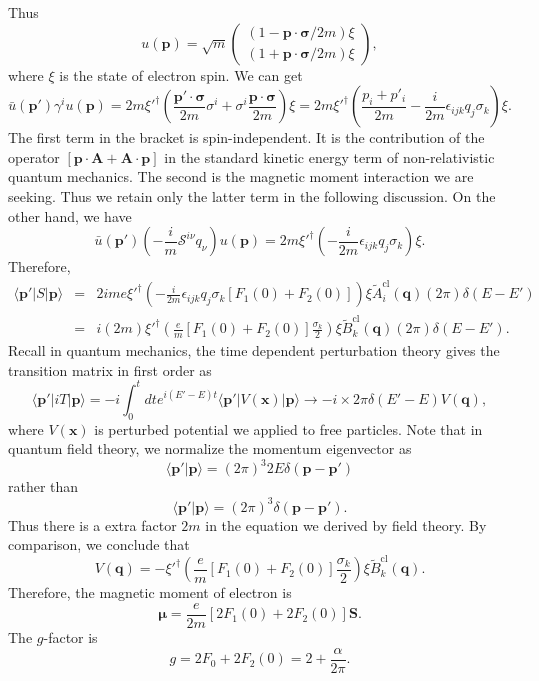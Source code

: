 Thus
\[u(\bm{p}) = \sqrt{m}  \begin{pmatrix}(1 - \bm{p}\cdot\bm{\sigma}/2m)\xi\\(1 + \bm{p}\cdot\bm{\sigma}/2m)\xi\end{pmatrix} ,\]
where $\xi$ is the state of electron spin. 
We can get
\[\bar{u}(\bm{p}') \gamma^i u(\bm{p}) = 2m \xi'^{\dagger} \left( \frac{\bm{p}'\cdot\bm{\sigma}}{2m}\sigma^i + \sigma^i\frac{\bm{p}\cdot\bm{\sigma}}{2m} \right) \xi = 2m \xi'^{\dagger} \left( \frac{p_i + p'_i}{2m} -\frac{i}{2m}\epsilon_{ijk}q_j\sigma_k \right) \xi.\]
The first term in the bracket is spin-independent. It is the contribution of the operator $[\bm{p}\cdot\bm{A} + \bm{A}\cdot\bm{p}]$ in the standard kinetic energy term of non-relativistic quantum mechanics. 
The second is the magnetic moment interaction we are seeking. Thus we retain only the latter term in the following discussion.
On the other hand, we have
\[\bar{u}(\bm{p}') \left( - \frac{i}{m}\mathcal{S}^{i\nu}q_{\nu} \right) u(\bm{p}) = 2m \xi'^{\dagger} \left( -\frac{i}{2m}\epsilon_{ijk}q_j\sigma_k \right) \xi.\]
Therefore,
\begin{eqnarray}
\langle \bm{p}' | S | \bm{p} \rangle &=& 2ime \xi'^{\dagger} \left( -\frac{i}{2m}\epsilon_{ijk}q_j\sigma_k[F_1(0) + F_2(0)] \right) \xi \tilde{A}_{i}^{\mathrm{cl}}(\bm{q})(2\pi)\delta(E-E') \nonumber \\
&=& i(2m)\xi'^{\dagger} \left( \frac{e}{m}[F_1(0) + F_2(0)] \frac{\sigma_k}{2}\right) \xi \tilde{B}_{k}^{\mathrm{cl}}(\bm{q})(2\pi)\delta(E-E'). \nonumber
\end{eqnarray}
Recall in quantum mechanics, the time dependent perturbation theory gives the transition matrix in first order as
\[\langle \bm{p}' | iT | \bm{p} \rangle = -i\int_0^t dt e^{i(E'-E)t} \langle \bm{p}' | V(\bm{x}) | \bm{p} \rangle \to -i\times 2\pi\delta(E'-E)V(\bm{q}),\]
where $V(\bm{x})$ is perturbed potential we applied to free particles. Note that in quantum field theory, we normalize the momentum eigenvector as
\[\langle \bm{p}' | \bm{p} \rangle = (2\pi)^3 2E \delta(\bm{p}-\bm{p}') \]
rather than
\[\langle \bm{p}' | \bm{p} \rangle = (2\pi)^3 \delta(\bm{p}-\bm{p}')  .\]
Thus there is a extra factor $2m$ in the equation we derived by field theory. By comparison, we conclude that
\[V(\bm{q}) = -\xi'^{\dagger} \left( \frac{e}{m}[F_1(0) + F_2(0)] \frac{\sigma_k}{2}\right) \xi \tilde{B}_{k}^{\mathrm{cl}}(\bm{q}).\]
Therefore, the magnetic moment of electron is
\[\bm{\mu} = \frac{e}{2m}[2F_1(0) + 2F_2(0)]\bm{S}.\]
The $g$-factor is
\[g = 2F_0 + 2F_2(0) = 2 + \frac{\alpha}{2\pi}.\]

